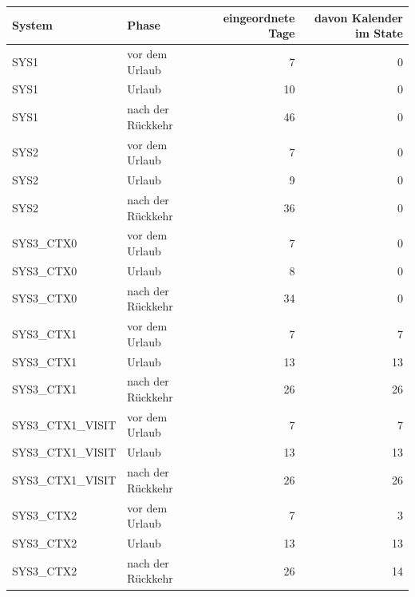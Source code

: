 \begin{tabular}{llrr}
\toprule
System & Phase & eingeordnete Tage & davon Kalender im State \\
\midrule
SYS1 & vor dem Urlaub & 7 & 0 \\
SYS1 & Urlaub & 10 & 0 \\
SYS1 & nach der Rückkehr & 46 & 0 \\
SYS2 & vor dem Urlaub & 7 & 0 \\
SYS2 & Urlaub & 9 & 0 \\
SYS2 & nach der Rückkehr & 36 & 0 \\
SYS3\_CTX0 & vor dem Urlaub & 7 & 0 \\
SYS3\_CTX0 & Urlaub & 8 & 0 \\
SYS3\_CTX0 & nach der Rückkehr & 34 & 0 \\
SYS3\_CTX1 & vor dem Urlaub & 7 & 7 \\
SYS3\_CTX1 & Urlaub & 13 & 13 \\
SYS3\_CTX1 & nach der Rückkehr & 26 & 26 \\
SYS3\_CTX1\_VISIT & vor dem Urlaub & 7 & 7 \\
SYS3\_CTX1\_VISIT & Urlaub & 13 & 13 \\
SYS3\_CTX1\_VISIT & nach der Rückkehr & 26 & 26 \\
SYS3\_CTX2 & vor dem Urlaub & 7 & 3 \\
SYS3\_CTX2 & Urlaub & 13 & 13 \\
SYS3\_CTX2 & nach der Rückkehr & 26 & 14 \\
\bottomrule
\end{tabular}
